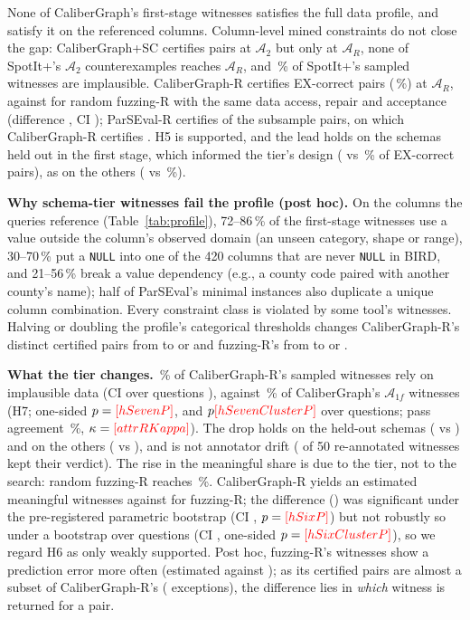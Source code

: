 None of CaliberGraph's  first-stage witnesses satisfies the full data profile, and  satisfy it on the referenced columns. Column-level mined constraints do not close the gap: CaliberGraph+SC certifies  pairs at $\mathcal A_2$ but only  at $\mathcal A_R$, none of SpotIt+'s  $\mathcal A_2$ counterexamples reaches $\mathcal A_R$, and \,\% of SpotIt+'s sampled witnesses are implausible. CaliberGraph-R certifies  EX-correct pairs (\,\%) at $\mathcal A_R$, against  for random fuzzing-R with the same data access, repair and acceptance (difference , CI ); ParSEval-R certifies  of the  subsample pairs, on which CaliberGraph-R certifies . H5 is supported, and the lead holds on the schemas held out in the first stage, which informed the tier's design ( vs \,\% of EX-correct pairs), as on the others ( vs \,\%).

\textbf{Why schema-tier witnesses fail the profile (post hoc).} On the columns the queries reference (Table~\ref{tab:profile}), 72--86\,\% of the first-stage witnesses use a value outside the column's observed domain (an unseen category, shape or range), 30--70\,\% put a \texttt{NULL} into one of the 420 columns that are never \texttt{NULL} in BIRD, and 21--56\,\% break a value dependency (e.g., a county code paired with another county's name); half of ParSEval's minimal instances also duplicate a unique column combination. Every constraint class is violated by some tool's witnesses. Halving or doubling the profile's categorical thresholds changes CaliberGraph-R's distinct certified pairs from  to  or  and fuzzing-R's from  to  or .

\textbf{What the tier changes.} \,\% of CaliberGraph-R's sampled witnesses rely on implausible data (CI over questions ), against \,\% of CaliberGraph's $\mathcal A_{1f}$ witnesses (H7; one-sided $p=\V{hSevenP}$, and $p\V{hSevenClusterP}$ over questions; pass agreement \,\%, $\kappa=\V{attrRKappa}$). The drop holds on the held-out schemas ( vs ) and on the others ( vs ), and is not annotator drift ( of 50 re-annotated witnesses kept their verdict). The rise in the meaningful share is due to the tier, not to the search: random fuzzing-R reaches \,\%. CaliberGraph-R yields an estimated  meaningful witnesses against  for fuzzing-R; the difference () was significant under the pre-registered parametric bootstrap (CI , $p=\V{hSixP}$) but not robustly so under a bootstrap over questions (CI , one-sided $p=\V{hSixClusterP}$), so we regard H6 as only weakly supported. Post hoc, fuzzing-R's witnesses show a prediction error more often (estimated  against ); as its certified pairs are almost a subset of CaliberGraph-R's ( exceptions), the difference lies in \emph{which} witness is returned for a pair.

